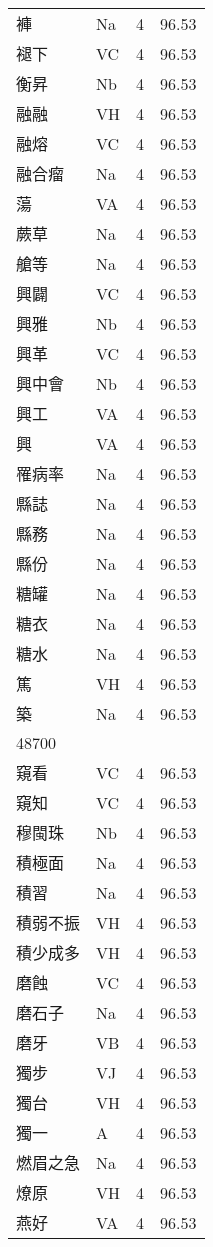 \documentclass[twocolumn]{book}
\begin{document}
\begin{supertabular}{llrr}
褲 & Na & 4 &  96.53\\
褪下 & VC & 4 &  96.53\\
衡昇 & Nb & 4 &  96.53\\
融融 & VH & 4 &  96.53\\
融熔 & VC & 4 &  96.53\\
融合瘤 & Na & 4 &  96.53\\
蕩 & VA & 4 &  96.53\\
蕨草 & Na & 4 &  96.53\\
艙等 & Na & 4 &  96.53\\
興闢 & VC & 4 &  96.53\\
興雅 & Nb & 4 &  96.53\\
興革 & VC & 4 &  96.53\\
興中會 & Nb & 4 &  96.53\\
興工 & VA & 4 &  96.53\\
興 & VA & 4 &  96.53\\
罹病率 & Na & 4 &  96.53\\
縣誌 & Na & 4 &  96.53\\
縣務 & Na & 4 &  96.53\\
縣份 & Na & 4 &  96.53\\
糖罐 & Na & 4 &  96.53\\
糖衣 & Na & 4 &  96.53\\
糖水 & Na & 4 &  96.53\\
篤 & VH & 4 &  96.53\\
築 & Na & 4 &  96.53\\
48700\\
窺看 & VC & 4 &  96.53\\
窺知 & VC & 4 &  96.53\\
穆閩珠 & Nb & 4 &  96.53\\
積極面 & Na & 4 &  96.53\\
積習 & Na & 4 &  96.53\\
積弱不振 & VH & 4 &  96.53\\
積少成多 & VH & 4 &  96.53\\
磨蝕 & VC & 4 &  96.53\\
磨石子 & Na & 4 &  96.53\\
磨牙 & VB & 4 &  96.53\\
獨步 & VJ & 4 &  96.53\\
獨台 & VH & 4 &  96.53\\
獨一 & A & 4 &  96.53\\
燃眉之急 & Na & 4 &  96.53\\
燎原 & VH & 4 &  96.53\\
燕好 & VA & 4 &  96.53\\

\end{supertabular}
\end{document}
